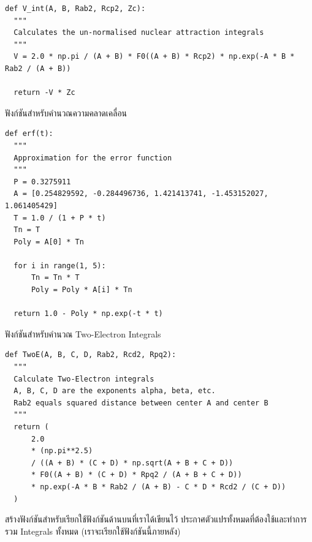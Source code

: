 \vspace{5pt}

\begin{lstlisting}[style=MyPython]
def V_int(A, B, Rab2, Rcp2, Zc):
  """
  Calculates the un-normalised nuclear attraction integrals
  """
  V = 2.0 * np.pi / (A + B) * F0((A + B) * Rcp2) * np.exp(-A * B * Rab2 / (A + B))

  return -V * Zc
\end{lstlisting}
%
\vspace{5pt}
%
ฟังก์ชันสำหรับคำนวณความคลาดเคลื่อน

\vspace{5pt}

\begin{lstlisting}[style=MyPython]
def erf(t):
  """
  Approximation for the error function
  """
  P = 0.3275911
  A = [0.254829592, -0.284496736, 1.421413741, -1.453152027, 1.061405429]
  T = 1.0 / (1 + P * t)
  Tn = T
  Poly = A[0] * Tn

  for i in range(1, 5):
      Tn = Tn * T
      Poly = Poly * A[i] * Tn

  return 1.0 - Poly * np.exp(-t * t)
\end{lstlisting}
%
\vspace{5pt}
%
ฟังก์ชันสำหรับคำนวณ Two-Electron Integrals

\vspace{5pt}

\begin{lstlisting}[style=MyPython]
def TwoE(A, B, C, D, Rab2, Rcd2, Rpq2):
  """
  Calculate Two-Electron integrals
  A, B, C, D are the exponents alpha, beta, etc.
  Rab2 equals squared distance between center A and center B
  """
  return (
      2.0
      * (np.pi**2.5)
      / ((A + B) * (C + D) * np.sqrt(A + B + C + D))
      * F0((A + B) * (C + D) * Rpq2 / (A + B + C + D))
      * np.exp(-A * B * Rab2 / (A + B) - C * D * Rcd2 / (C + D))
  )
\end{lstlisting}
%
\vspace{5pt}
%
สร้างฟังก์ชันสำหรับเรียกใช้ฟังก์ชันด้านบนที่เราได้เขียนไว้ ประกาศตัวแปรทั้งหมดที่ต้องใช้และทำการรวม Integrals ทั้งหมด (เราจะเรียกใช้ฟังก์ชันนี้ภายหลัง)

\vspace{5pt}


